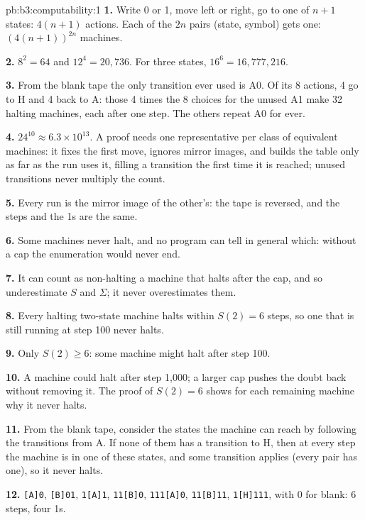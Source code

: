 \begin{solution}{pb:b3:computability:1}
\textbf{1.} Write 0 or 1, move left or right, go to one of $n + 1$ states: $4(n + 1)$ actions. Each of the $2n$ pairs (state, symbol) gets one: $(4(n + 1))^{2n}$ machines.

\textbf{2.} $8^2 = 64$ and $12^4 = 20{,}736$. For three states, $16^6 = 16{,}777{,}216$.

\textbf{3.} From the blank tape the only transition ever used is A0. Of its 8 actions, 4 go to H and 4 back to A: those 4 times the 8 choices for the unused A1 make 32 halting machines, each after one step. The others repeat A0 for ever.

\textbf{4.} $24^{10} \approx 6.3 \times 10^{13}$. A proof needs one representative per class of equivalent machines: it fixes the first move, ignores mirror images, and builds the table only as far as the run uses it, filling a transition the first time it is reached; unused transitions never multiply the count.

\textbf{5.} Every run is the mirror image of the other's: the tape is reversed, and the steps and the 1s are the same.

\textbf{6.} Some machines never halt, and no program can tell in general which: without a cap the enumeration would never end.

\textbf{7.} It can count as non-halting a machine that halts after the cap, and so underestimate $S$ and $\Sigma$; it never overestimates them.

\textbf{8.} Every halting two-state machine halts within $S(2) = 6$ steps, so one that is still running at step 100 never halts.

\textbf{9.} Only $S(2) \ge 6$: some machine might halt after step 100.

\textbf{10.} A machine could halt after step 1,000; a larger cap pushes the doubt back without removing it. The proof of $S(2) = 6$ shows for each remaining machine why it never halts.

\textbf{11.} From the blank tape, consider the states the machine can reach by following the transitions from A. If none of them has a transition to H, then at every step the machine is in one of these states, and some transition applies (every pair has one), so it never halts.

\textbf{12.} \texttt{[A]0}, \texttt{[B]01}, \texttt{1[A]1}, \texttt{11[B]0}, \texttt{111[A]0}, \texttt{11[B]11}, \texttt{1[H]111}, with 0 for blank: 6 steps, four 1s.


\end{solution}
